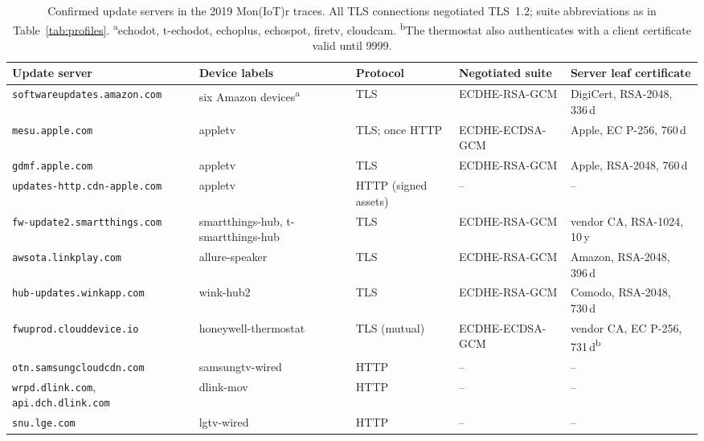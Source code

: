 \begin{table}[!t]
    \centering
    \color{blue}
    \caption{Confirmed update servers in the 2019 Mon(IoT)r traces. All TLS connections negotiated TLS~1.2; suite abbreviations as in Table~\ref{tab:profiles}. \textsuperscript{a}echodot, t-echodot, echoplus, echospot, firetv, cloudcam. \textsuperscript{b}The thermostat also authenticates with a client certificate valid until 9999.}
    \label{tab:retro}
    \setlength{\tabcolsep}{4pt}
    \footnotesize
    \begin{tabular}{@{} l l l l l @{}}
        \toprule
        \textbf{Update server} & \textbf{Device labels} & \textbf{Protocol} & \textbf{Negotiated suite} & \textbf{Server leaf certificate} \\
        \midrule
        \texttt{softwareupdates.amazon.com} & six Amazon devices\textsuperscript{a} & TLS & ECDHE-RSA-GCM & DigiCert, RSA-2048, 336\,d \\
        \texttt{mesu.apple.com}             & appletv                     & TLS; once HTTP & ECDHE-ECDSA-GCM & Apple, EC P-256, 760\,d \\
        \texttt{gdmf.apple.com}             & appletv                     & TLS            & ECDHE-RSA-GCM   & Apple, RSA-2048, 760\,d \\
        \texttt{updates-http.cdn-apple.com} & appletv                     & HTTP (signed assets) & --        & -- \\
        \texttt{fw-update2.smartthings.com} & smartthings-hub, t-smartthings-hub & TLS     & ECDHE-RSA-GCM   & vendor CA, RSA-1024, 10\,y \\
        \texttt{awsota.linkplay.com}        & allure-speaker              & TLS            & ECDHE-RSA-GCM   & Amazon, RSA-2048, 396\,d \\
        \texttt{hub-updates.winkapp.com}    & wink-hub2                   & TLS            & ECDHE-RSA-GCM   & Comodo, RSA-2048, 730\,d \\
        \texttt{fwuprod.clouddevice.io}     & honeywell-thermostat        & TLS (mutual)   & ECDHE-ECDSA-GCM & vendor CA, EC P-256, 731\,d\textsuperscript{b} \\
        \texttt{otn.samsungcloudcdn.com}    & samsungtv-wired             & HTTP           & --              & -- \\
        \texttt{wrpd.dlink.com}, \texttt{api.dch.dlink.com} & dlink-mov    & HTTP           & --              & -- \\
        \texttt{snu.lge.com}                & lgtv-wired                  & HTTP           & --              & -- \\
        \bottomrule
    \end{tabular}
\end{table}

